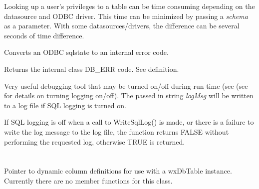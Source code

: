 Looking up a user's privileges to a table can be time consuming depending on the 
datasource and ODBC driver.  This time can be minimized by passing a {\it schema} 
as a parameter.  With some datasources/drivers, the difference can be several 
seconds of time difference.


\label{wxdbtranslatesqlstate}


Converts an ODBC sqlstate to an internal error code.




Returns the internal class DB\_ERR code.  See  definition.


\label{wxdbwritesqllog}





Very useful debugging tool that may be turned on/off during run time (see 
(see  for details on 
turning logging on/off).  The passed in string {\it logMsg} will be written to 
a log file if SQL logging is turned on.


If SQL logging is off when a call to WriteSqlLog() is made, or there is a
failure to write the log message to the log file, the function returns
FALSE without performing the requested log, otherwise TRUE is returned.




\section{}\label{wxdbcoldataptr}

Pointer to dynamic column definitions for use with a wxDbTable instance.  
Currently there are no member functions for this class.

